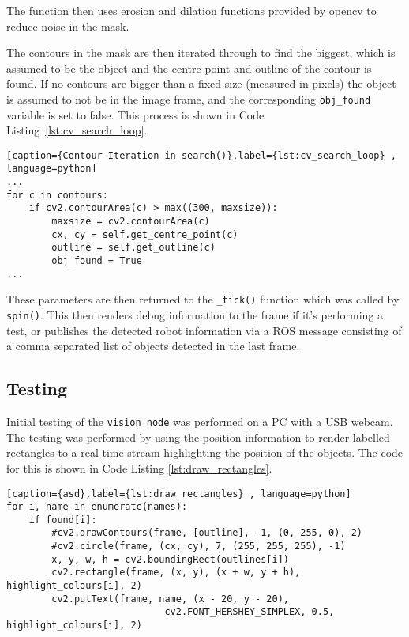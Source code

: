 The function then uses erosion and dilation functions provided by opencv to reduce noise in the
mask.

The contours in the mask are then iterated through to find the biggest, which is assumed to be
the object and the centre point and outline of the contour is found. If no contours are bigger
than a fixed size (measured in pixels) the object is assumed to not be in the image frame, and
the corresponding \verb|obj_found| variable is set to false. This process is shown in Code
Listing~\ref{lst:cv_search_loop}.

\begin{lstlisting}[caption={Contour Iteration in search()},label={lst:cv_search_loop} , language=python]
...
for c in contours:
    if cv2.contourArea(c) > max((300, maxsize)):
        maxsize = cv2.contourArea(c)
        cx, cy = self.get_centre_point(c)
        outline = self.get_outline(c)
        obj_found = True
...
\end{lstlisting}

These parameters are then returned to the \verb|_tick()| function which was called by
\verb|spin()|. This then renders debug information to the frame if it's performing a test, or
publishes the detected robot information via a ROS message consisting of a comma separated list of
objects detected in the last frame.

\subsection{Testing}\label{soft/cv/test}
Initial testing of the \verb|vision_node| was performed on a PC with a USB webcam. The
testing was performed by using the position information to render labelled rectangles to a real
time stream highlighting the position of the objects. The code for this is shown in Code
Listing \ref{lst:draw_rectangles}.

\begin{lstlisting}[caption={asd},label={lst:draw_rectangles} , language=python]
for i, name in enumerate(names):
    if found[i]:
        #cv2.drawContours(frame, [outline], -1, (0, 255, 0), 2)
        #cv2.circle(frame, (cx, cy), 7, (255, 255, 255), -1)
        x, y, w, h = cv2.boundingRect(outlines[i])
        cv2.rectangle(frame, (x, y), (x + w, y + h), highlight_colours[i], 2)
        cv2.putText(frame, name, (x - 20, y - 20),
                            cv2.FONT_HERSHEY_SIMPLEX, 0.5, highlight_colours[i], 2)
\end{lstlisting}

